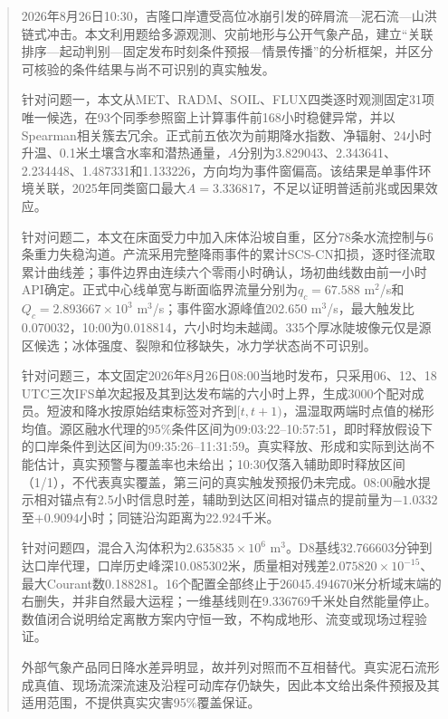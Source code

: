 \documentclass{MMCStyle}
\begin{document}
\begin{abstract}
\linespread{1.10}\selectfont
2026年8月26日10:30，吉隆口岸遭受高位冰崩引发的碎屑流—泥石流—山洪链式冲击。本文利用题给多源观测、灾前地形与公开气象产品，建立“关联排序—起动判别—固定发布时刻条件预报—情景传播”的分析框架，并区分可核验的条件结果与尚不可识别的真实触发。

针对问题一，本文从MET、RADM、SOIL、FLUX四类逐时观测固定31项唯一候选，在93个同季参照窗上计算事件前168小时稳健异常，并以Spearman相关簇去冗余。正式前五依次为前期降水指数、净辐射、24小时升温、0.1米土壤含水率和潜热通量，$A$分别为3.829043、2.343641、2.234448、1.487331和1.133226，方向均为事件窗偏高。该结果是单事件环境关联，2025年同类窗口最大$A=3.336817$，不足以证明普适前兆或因果效应。

针对问题二，本文在床面受力中加入床体沿坡自重，区分78条水流控制与6条重力失稳沟道。产流采用完整降雨事件的累计SCS-CN扣损，逐时径流取累计曲线差；事件边界由连续六个零雨小时确认，场初曲线数由前一小时API确定。正式中心线单宽与断面临界流量分别为$q_c=67.588$ m$^2$/s和$Q_c=2.893667\times10^3$ m$^3$/s；事件窗水源峰值202.650 m$^3$/s，最大触发比0.070032，10:00为0.018814，六小时均未越阈。335个厚冰陡坡像元仅是源区候选；冰体强度、裂隙和位移缺失，冰力学状态尚不可识别。

针对问题三，本文固定2026年8月26日08:00当地时发布，只采用06、12、18 UTC三次IFS单次起报及其到达发布端的六小时上界，生成3000个配对成员。短波和降水按原始结束标签对齐到$[t,t+1)$，温湿取两端时点值的梯形均值。源区融水代理的95\%条件区间为09:03:22--10:57:51，即时释放假设下的口岸条件到达区间为09:35:26--11:31:59。真实释放、形成和实际到达尚不能估计，真实预警与覆盖率也未给出；10:30仅落入辅助即时释放区间（1/1），不代表真实覆盖，第三问的真实触发预报仍未完成。08:00融水提示相对锚点有2.5小时信息时差，辅助到达区间相对锚点的提前量为$-1.0332$至$+0.9094$小时；同链沿沟距离为22.924千米。

针对问题四，混合入沟体积为$2.635835\times10^6$ m$^3$。D8基线32.766603分钟到达口岸代理，口岸历史峰深10.085302米，质量相对残差$2.075820\times10^{-15}$、最大Courant数0.188281。16个配置全部终止于26045.494670米分析域末端的右删失，并非自然最大运程；一维基线则在9.336769千米处自然能量停止。数值闭合说明给定离散方案内守恒一致，不构成地形、流变或现场过程验证。

外部气象产品同日降水差异明显，故并列对照而不互相替代。真实泥石流形成真值、现场流深流速及沿程可动库存仍缺失，因此本文给出条件预报及其适用范围，不提供真实灾害95\%覆盖保证。
\end{abstract}
\begingroup
\pagestyle{empty}
\linespread{1.00}\selectfont
\tableofcontents
\clearpage
\endgroup
{}
\linespread{1.20}\selectfont
\pagestyle{fancy}






{}
\end{document}
